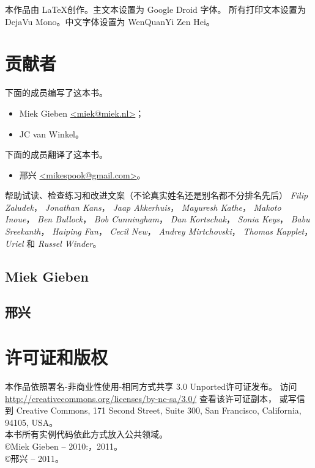 \noindent{}本作品由 \LaTeX 创作。主文本设置为 Google Droid 字体。
所有打印文本设置为 DejaVu Mono。中文字体设置为 WenQuanYi Zen Hei。

\section{贡献者}
下面的成员编写了这本书。
\begin{itemize}
\item{Miek Gieben \qquad\url{<miek@miek.nl>}}；
\item{JC van Winkel}。
\end{itemize}
下面的成员翻译了这本书。
\begin{itemize}
    \item{邢兴 \qquad\url{<mikespook@gmail.com>}}。
\end{itemize}

帮助试读、检查练习和改进文案（不论真实姓名还是别名都不分排名先后）
\emph{Filip Zaludek}，
\emph{Jonathan Kans}，
\emph{Jaap Akkerhuis}，
\emph{Mayuresh Kathe}，
\emph{Makoto Inoue}，
\emph{Ben Bullock}，
\emph{Bob Cunningham}，
\emph{Dan Kortschak}，
\emph{Sonia Keys}，
\emph{Babu Sreekanth}，
\emph{Haiping Fan}，
\emph{Cecil New}，
\emph{Andrey Mirtchovski}，
\emph{Thomas Kapplet}，
\emph{Uriel} 
和 \emph{Russel Winder}。

\subsection{Miek Gieben}


\subsection{邢兴}


\section{许可证和版权}

本作品依照署名-非商业性使用-相同方式共享 3.0 Unported许可证发布。
访问 \url{http://creativecommons.org/licenses/by-nc-sa/3.0/} 查看该许可证副本，
或写信到 Creative Commons, 171 Second Street, Suite 300,
San Francisco, California, 94105, USA。\\
本书所有实例代码依此方式放入公共领域。\\
\copyright Miek Gieben -- 2010:，2011。\\
\copyright 邢兴 -- 2011。

